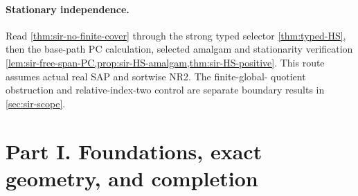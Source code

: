 \documentclass[11pt,a4paper]{article}
\theoremstyle{remark}\newtheorem{remark}[theorem]{Remark}
\theoremstyle{definition}
\theoremstyle{remark}
\begin{document}
\paragraph{Stationary independence.}
Read \cref{thm:sir-no-finite-cover} through the strong typed selector
\cref{thm:typed-HS}, then the base-path PC calculation, selected amalgam
and stationarity verification
\cref{lem:sir-free-span-PC,prop:sir-HS-amalgam,thm:sir-HS-positive}.
This route assumes actual real SAP and sortwise NR2. The finite-global-
quotient obstruction and relative-index-two control are separate
boundary results in \cref{sec:sir-scope}.


\section*{Part I. Foundations, exact geometry, and completion}





































\end{document}
